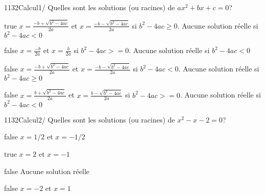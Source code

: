         	\begin{question}{1132}{Calcul}{1}{/}
				Quelles sont les solutions (ou racines) de $ax^2+bx+c=0$?
            \end{question}
            \begin{reponses}
            	\item[true] $x=\frac{-b+\sqrt{b^2-4ac}}{2a}$ et $x=\frac{-b-\sqrt{b^2-4ac}}{2a}$ si $b^2-4ac\geq 0$. Aucune solution réelle si $b^2-4ac<0$
            	\item[false] $x=\frac{-b}{2a}$ et $x=\frac{b}{2a}$ si $b^2-4ac>=0$. Aucune solution réelle si $b^2-4ac<0$
                \item[false] $x=\frac{-b+\sqrt{b^2-4ac}}{2a}$ et $x=\frac{-b-\sqrt{b^2-4ac}}{2a}$ si $b^2-4ac<0$. Aucune solution réelle si $b^2-4ac\geq 0$
                \item[false] $x=\frac{b+\sqrt{b^2-4ac}}{2a}$ et $x=\frac{b-\sqrt{b^2-4ac}}{2a}$ si $b^2-4ac>=0$. Aucune solution réelle si $b^2-4ac<0$
            \end{reponses}
        	\begin{question}{1132}{Calcul}{2}{/}
				Quelles sont les solutions (ou racines) de $x^2-x-2=0$?
            \end{question}
            \begin{reponses}
            	\item[false] $x=1/2$ et $x=-1/2$
            	\item[true] $x=2$ et $x=-1$
                \item[false] Aucune solution réelle
                \item[false] $x=-2$ et $x=1$
            \end{reponses}

